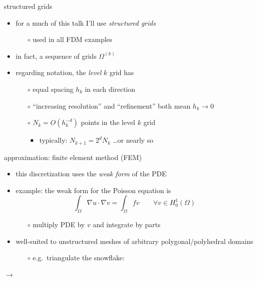 \documentclass[hide notes,intlimits,usenames,dvipsnames]{beamer}
\newcommand{\grad}{\nabla}
\begin{document}
\begin{frame}{structured grids}
\begin{itemize}
\item for a much of this talk I'll use \emph{structured grids}
	\begin{itemize}
	\item[$\circ$] used in all FDM examples
	\end{itemize}
\item in fact, a sequence of grids $\Omega^{(k)}$
\item regarding notation, the \emph{level} $k$ grid has
	\begin{itemize}
	\item[$\circ$] equal spacing $h_k$ in each direction
	\item[$\circ$] ``increasing resolution'' and ``refinement'' both mean $h_k \to 0$
    \item[$\circ$] $N_k = O(h_k^{-d})$ points in the level $k$ grid
	    \begin{itemize}
	    \item typically: $N_{k+1} = 2^d N_k$ \hfill \dots or nearly so
	    \end{itemize}
	\end{itemize}

\bigskip

\end{itemize}
\end{frame}


\begin{frame}{approximation: finite element method (FEM)}
\begin{itemize}
\item this discretization uses the \emph{weak form} of the PDE
\item example: the weak form for the Poisson equation is
    $$\int_\Omega \grad u \cdot \grad v = \int_\Omega f v \qquad \forall v \in H_0^1(\Omega)$$
    \vspace{-4mm}
	\begin{itemize}
	\item[$\circ$] multiply PDE by $v$ and integrate by parts
	\end{itemize}
\item well-suited to unstructured meshes of arbitrary polygonal/polyhedral domains
	\begin{itemize}
	\item[$\circ$] e.g.~triangulate the snowflake:
	\end{itemize}
\end{itemize}

\begin{center}
\begin{tikzpicture}[scale=1.5,baseline]  \end{tikzpicture}
\qquad $\to$ \qquad
\begin{tikzpicture}[scale=1.5,baseline]  \end{tikzpicture}
\end{center}
\end{frame}
\end{document}
